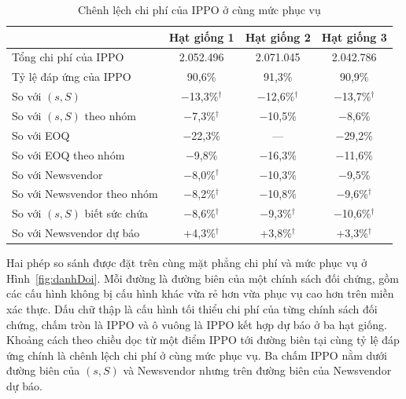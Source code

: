\begin{table}[H]
    \centering
    \caption{Chênh lệch chi phí của IPPO ở cùng mức phục vụ}
    \label{tab:isoService}
    \begin{tabular}{|l|c|c|c|}
        \hline
        & Hạt giống 1 & Hạt giống 2 & Hạt giống 3 \\
        \hline
        Tổng chi phí của IPPO & 2.052.496 & 2.071.045 & 2.042.786 \\ \hline
        Tỷ lệ đáp ứng của IPPO & 90,6\% & 91,3\% & 90,9\% \\ \hline
        So với $(s, S)$ & $-$13,3\%$^{\dagger}$ & $-$12,6\%$^{\dagger}$ & $-$13,7\%$^{\dagger}$ \\ \hline
        So với $(s, S)$ theo nhóm & $-$7,3\%$^{\dagger}$ & $-$10,5\% & $-$8,6\% \\ \hline
        So với EOQ & $-$22,3\% & --- & $-$29,2\% \\ \hline
        So với EOQ theo nhóm & $-$9,8\% & $-$16,3\% & $-$11,6\% \\ \hline
        So với Newsvendor & $-$8,0\%$^{\dagger}$ & $-$10,3\% & $-$9,5\% \\ \hline
        So với Newsvendor theo nhóm & $-$8,2\%$^{\dagger}$ & $-$10,8\% & $-$9,6\%$^{\dagger}$ \\ \hline
        So với $(s, S)$ biết sức chứa & $-$8,6\%$^{\dagger}$ & $-$9,3\%$^{\dagger}$ & $-$10,6\%$^{\dagger}$ \\ \hline
        So với Newsvendor dự báo & +4,3\%$^{\dagger}$ & +3,8\%$^{\dagger}$ & +3,3\%$^{\dagger}$ \\
        \hline
    \end{tabular}
\end{table}

Hai phép so sánh được đặt trên cùng mặt phẳng chi phí và mức phục vụ ở Hình~\ref{fig:danhDoi}. Mỗi đường là đường biên của một chính sách đối chứng, gồm các cấu hình không bị cấu hình khác vừa rẻ hơn vừa phục vụ cao hơn trên miền xác thực. Dấu chữ thập là cấu hình tối thiểu chi phí của từng chính sách đối chứng, chấm tròn là IPPO và ô vuông là IPPO kết hợp dự báo ở ba hạt giống. Khoảng cách theo chiều dọc từ một điểm IPPO tới đường biên tại cùng tỷ lệ đáp ứng chính là chênh lệch chi phí ở cùng mức phục vụ. Ba chấm IPPO nằm dưới đường biên của $(s,S)$ và Newsvendor nhưng trên đường biên của Newsvendor dự báo.

